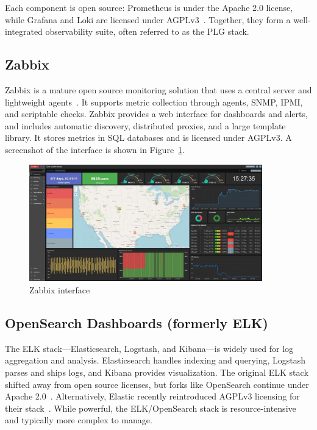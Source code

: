 Each component is open source: Prometheus is under the Apache 2.0 license, while Grafana and Loki are licensed under AGPLv3~\cite{grafana-license-change}. Together, they form a well-integrated observability suite, often referred to as the PLG stack.

\subsection*{Zabbix}
Zabbix is a mature open source monitoring solution that uses a central server and lightweight agents~\cite{zabbix-web}. It supports metric collection through agents, SNMP, IPMI, and scriptable checks. Zabbix provides a web interface for dashboards and alerts, and includes automatic discovery, distributed proxies, and a large template library. It stores metrics in SQL databases and is licensed under AGPLv3. A screenshot of the interface is shown in Figure~\ref{fig:zabbix-ui}.

\begin{figure}[H]
  \centering
  \includegraphics[width=0.9\textwidth]{imaxes/zabbix-ui.png}
  \caption{Zabbix interface}
  \label{fig:zabbix-ui}
\end{figure}

\subsection*{OpenSearch Dashboards (formerly ELK)}
The ELK stack—Elasticsearch, Logstash, and Kibana—is widely used for log aggregation and analysis. Elasticsearch handles indexing and querying, Logstash parses and ships logs, and Kibana provides visualization. The original ELK stack shifted away from open source licenses, but forks like OpenSearch continue under Apache 2.0~\cite{opensearch-web}. Alternatively, Elastic recently reintroduced AGPLv3 licensing for their stack~\cite{elastic-license}. While powerful, the ELK/OpenSearch stack is resource-intensive and typically more complex to manage.


